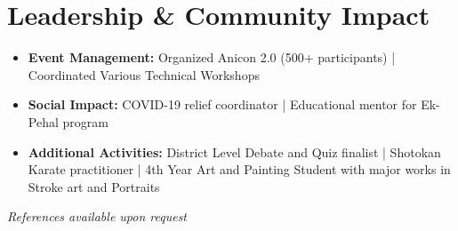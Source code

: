 \documentclass[a4paper,11pt]{article}
\newcommand{\compactSection}[2]{
    \section{#1}
    \vspace{-0.1cm}
    #2
    \vspace{-0.2cm}
}
\begin{document}
\compactSection{Leadership \& Community Impact}{
\begin{itemize}[leftmargin=*,label={},itemsep=2pt]
    \item \textbf{Event Management:} \small {Organized Anicon 2.0 (500+ participants) | Coordinated Various Technical Workshops}
    \item \textbf{Social Impact:} \small{ COVID-19 relief coordinator | Educational mentor for Ek-Pehal program}
    \item \textbf{Additional Activities:} \small {District Level Debate and Quiz finalist | Shotokan Karate practitioner | 4th Year Art and Painting Student with major works in Stroke art and Portraits}
\end{itemize}}

\vspace*{\fill}
\begin{flushright}
\textit{References available upon request}
\end{flushright}
\end{document}
